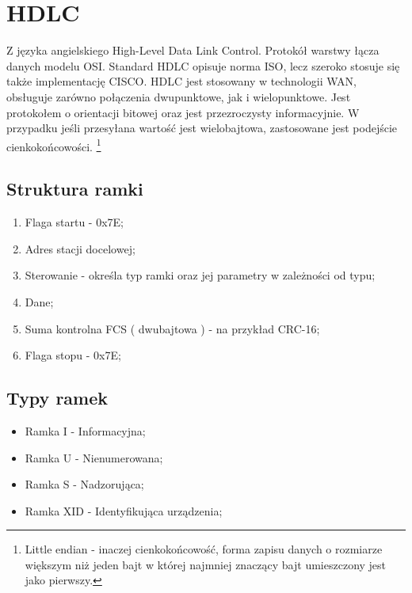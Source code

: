 \section{HDLC}
Z języka angielskiego High-Level Data Link Control. Protokół warstwy łącza danych modelu OSI. 
Standard HDLC opisuje norma ISO, lecz szeroko stosuje się także implementację CISCO.
HDLC jest stosowany w technologii WAN, obsługuje zarówno połączenia dwupunktowe, jak i wielopunktowe. 
Jest protokołem o orientacji bitowej oraz jest przezroczysty informacyjnie. \autocite{WIKI_HDLC}
W przypadku jeśli przesyłana wartość jest wielobajtowa, zastosowane jest podejście cienkokońcowości.
\footnote{\label{Little endian} Little endian - inaczej cienkokońcowość, forma zapisu danych o rozmiarze większym niż jeden bajt w której najmniej znaczący bajt umieszczony jest jako pierwszy.}
\subsection{Struktura ramki}
\begin{enumerate}
    \item Flaga startu - 0x7E;
    \item Adres stacji docelowej;
    \item Sterowanie - określa typ ramki oraz jej parametry w zależności od typu;
    \item Dane;
    \item Suma kontrolna FCS ( dwubajtowa ) - na przykład CRC-16;
    \item Flaga stopu - 0x7E;
\end{enumerate}
\subsection{Typy ramek}
\begin{itemize}
    \item Ramka I - Informacyjna;
    \item Ramka U - Nienumerowana;
    \item Ramka S - Nadzorująca;
    \item Ramka XID - Identyfikująca urządzenia;
\end{itemize}
